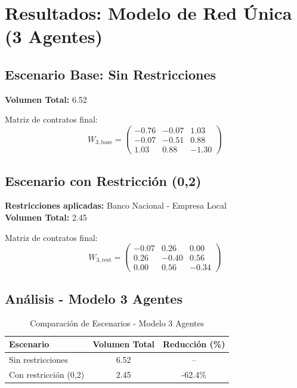 \documentclass[12pt]{article}
\begin{document}
\section{Resultados: Modelo de Red Única (3 Agentes)}

\subsection{Escenario Base: Sin Restricciones}

\textbf{Volumen Total:} 6.52

Matriz de contratos final:
\begin{equation}
W_{3,\text{base}} = \begin{pmatrix}
-0.76 & -0.07 &  1.03 \\
-0.07 & -0.51 &  0.88 \\
 1.03 &  0.88 & -1.30
\end{pmatrix}
\end{equation}

\subsection{Escenario con Restricción (0,2)}

\textbf{Restricciones aplicadas:} Banco Nacional - Empresa Local\\
\textbf{Volumen Total:} 2.45

Matriz de contratos final:
\begin{equation}
W_{3,\text{rest}} = \begin{pmatrix}
-0.07 &  0.26 &  0.00 \\
 0.26 & -0.40 &  0.56 \\
 0.00 &  0.56 & -0.34
\end{pmatrix}
\end{equation}

\subsection{Análisis - Modelo 3 Agentes}

\begin{table}[H]
\centering
\caption{Comparación de Escenarios - Modelo 3 Agentes}
\begin{tabular}{lcc}
\toprule
\textbf{Escenario} & \textbf{Volumen Total} & \textbf{Reducción (\%)} \\
\midrule
Sin restricciones & 6.52 & -- \\
Con restricción (0,2) & 2.45 & -62.4\% \\
\bottomrule
\end{tabular}
\end{table}
\end{document}

